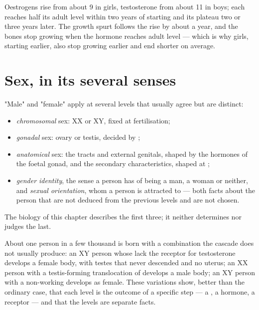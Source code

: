 \begin{example}\label{ex:g11:becoming-male-female:curves}
Oestrogens rise from about 9 in girls, testosterone from about 11 in
boys; each reaches half its adult level within two years of starting
and its plateau two or three years later. The growth spurt follows the
rise by about a year, and the bones stop growing when the hormone
reaches adult level --- which is why girls, starting earlier, also stop
growing earlier and end shorter on average.
\end{example}

\section{Sex, in its several senses}

\begin{proposition}\label{prop:g11:becoming-male-female:levels}
"Male" and "female" apply at several levels that usually agree but
are distinct:
\begin{itemize}
  \item \emph{chromosomal} sex: XX or XY, fixed at fertilisation;
  \item \emph{gonadal} sex: ovary or testis, decided by ;
  \item \emph{anatomical} sex: the tracts and external genitals,
        shaped by the hormones of the foetal gonad, and the secondary
        characteristics, shaped at ;
  \item \emph{gender identity}, the sense a person has of being a man,
        a woman or neither, and \emph{sexual orientation}, whom a
        person is attracted to --- both facts about the person that
        are not deduced from the previous levels and are not chosen.
\end{itemize}
The biology of this chapter describes the first three; it neither
determines nor judges the last.
\end{proposition}
\admitted

\begin{example}\label{ex:g11:becoming-male-female:disagree}
About one person in a few thousand is born with a combination the
cascade does not usually produce: an XY person whose  lack the
receptor for testosterone develops a female body, with testes that
never descended and no uterus; an XX person with a testis-forming
translocation of  develops a male body; an XY person with a
non-working  develops as female. These variations show, better
than the ordinary case, that each level is the outcome of a specific
step --- a , a hormone, a receptor --- and that the levels are
separate facts.
\end{example}

